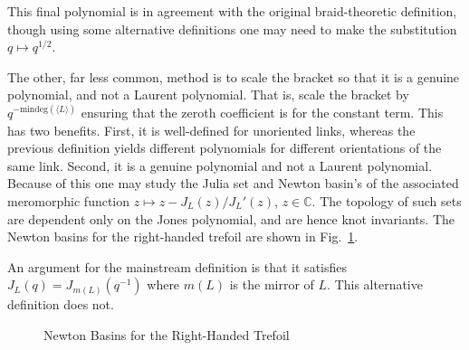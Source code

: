         This final polynomial is in agreement with the original braid-theoretic
        definition, though using some alternative definitions one may need to
        make the substitution $q\mapsto{q}^{1/2}$.
        \par\hfill\par
        The other, far less common, method is to scale the bracket so that
        it is a genuine polynomial, and not a Laurent polynomial. That is,
        scale the bracket by $q^{-\textrm{mindeg}(\langle{L}\rangle)}$
        ensuring that the zeroth coefficient is for the constant term. This has
        two benefits. First, it is well-defined for unoriented links, whereas
        the previous definition yields different polynomials for different
        orientations of the same link. Second, it is a genuine polynomial and
        not a Laurent polynomial. Because of this one may study the Julia set
        and Newton basin's of the associated meromorphic function
        $z\mapsto{z}-J_{L}(z)/J_{L}'(z)$, $z\in\mathbb{C}$. The topology of
        such sets are dependent only on the Jones polynomial, and
        are hence knot invariants. The Newton basins for the right-handed
        trefoil are shown in
        Fig.~\ref{fig:newton_fractal_right_trefoil_jones}.
        \par\hfill\par
        An argument for the mainstream definition is that it satisfies
        $J_{L}(q)=J_{m(L)}(q^{-1})$ where $m(L)$ is the mirror of $L$. This
        alternative definition does not.
        \begin{figure}
            \centering
            \caption{Newton Basins for the Right-Handed Trefoil}
            \label{fig:newton_fractal_right_trefoil_jones}
        \end{figure}
